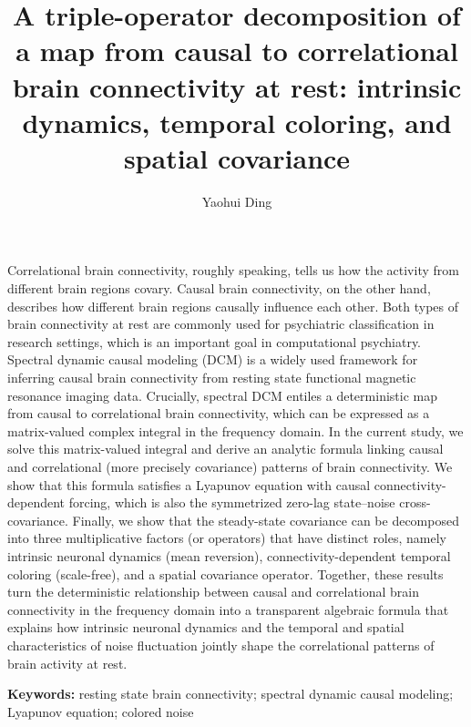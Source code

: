 \documentclass[12pt]{article}
\title{A triple-operator decomposition of a map from causal to correlational brain connectivity at rest: intrinsic dynamics, temporal coloring, and spatial covariance}
\author{Yaohui Ding}
\makeatletter
\renewcommand\section{\@startsection{section}{1}{\z@}{1.5ex plus .5ex minus .2ex}{0.6ex plus .2ex}{\normalfont\Large\bfseries}}
\renewenvironment{abstract}{%
  \noindent{\bfseries \abstractname}\par\vspace{-4pt}\noindent\ignorespaces
}{}
\makeatother
\begin{document}
\setcounter{secnumdepth}{-1}
\maketitle
\linenumbers 
\begin{abstract}
Correlational brain connectivity, roughly speaking, tells us how the activity from different brain regions covary. Causal brain connectivity, on the other hand, describes how different brain regions causally influence each other. Both types of brain connectivity at rest are commonly used for psychiatric classification in research settings, which is an important goal in computational psychiatry. Spectral dynamic causal modeling (DCM) is a widely used framework for inferring causal brain connectivity from resting state functional magnetic resonance imaging data. Crucially, spectral DCM entiles a deterministic map from causal to correlational brain connectivity, which can be expressed as a matrix-valued complex integral in the frequency domain. In the current study, we solve this matrix-valued integral and derive an analytic formula linking causal and correlational (more precisely covariance) patterns of brain connectivity. We show that this formula satisfies a Lyapunov equation with causal connectivity-dependent forcing, which is also the symmetrized zero-lag state--noise cross-covariance. Finally, we show that the steady-state covariance can be decomposed into three multiplicative factors (or operators) that have distinct roles, namely intrinsic neuronal dynamics (mean reversion), connectivity-dependent temporal coloring (scale-free), and a spatial covariance operator. Together, these results turn the deterministic relationship between causal and correlational brain connectivity in the frequency domain into a transparent algebraic formula that explains how intrinsic neuronal dynamics and the temporal and spatial characteristics of noise fluctuation jointly shape the correlational patterns of brain activity at rest.
\end{abstract}
\par\smallskip
\noindent\textbf{Keywords:} resting state brain connectivity; spectral dynamic causal modeling; Lyapunov equation; colored noise
\section{Introduction}
\label{sec:intro}
\end{document}
